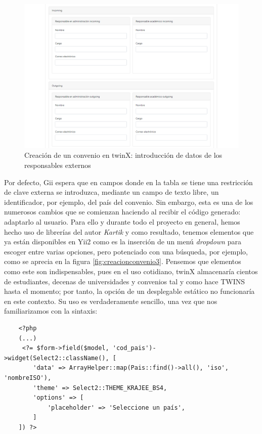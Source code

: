 \begin{figure}
	\centering
	\includegraphics[width=\textwidth]{img/Capturas de twinX/creacion_convenio_2}
	\caption[Creación de un convenio en twinX 2]{Creación de un convenio en twinX: introducción de datos de los responsables externos}
	\label{fig:creacionconvenio2}
\end{figure}

Por defecto, Gii espera que en campos donde en la tabla se tiene una restricción de clave externa se introduzca, mediante un campo de texto libre, un identificador, por ejemplo, del país del convenio. Sin embargo, esta es una de los numerosos cambios que se comienzan haciendo al recibir el código generado: adaptarlo al usuario. Para ello y durante todo el proyecto en general, hemos hecho uso de librerías del autor \textit{Kartik} \cite{krajee} y como resultado, tenemos elementos que ya están disponibles en Yii2 como es la inserción de un menú \textit{dropdown} para escoger entre varias opciones, pero potenciado con una búsqueda, por ejemplo, como se aprecia en la figura \ref{fig:creacionconvenio3}. Pensemos que elementos como este son indispensables, pues en el uso cotidiano, twinX almacenaría cientos de estudiantes, decenas de universidades y convenios tal y como hace TWINS hasta el momento; por tanto, la opción de un desplegable estático no funcionaría en este contexto. Su uso es verdaderamente sencillo, una vez que nos familiarizamos con la sintaxis:

\begin{verbatim}
	<?php
	(...)	
	 <?= $form->field($model, 'cod_pais')->widget(Select2::className(), [
		'data' => ArrayHelper::map(Pais::find()->all(), 'iso', 'nombreISO'),
		'theme' => Select2::THEME_KRAJEE_BS4,
		'options' => [
			'placeholder' => 'Seleccione un país',
		]
	]) ?>
	
\end{verbatim}


